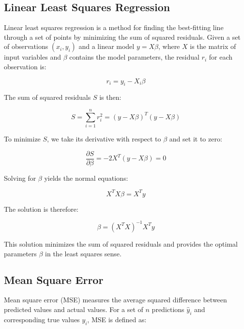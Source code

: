 \subsection{Linear Least Squares Regression}
Linear least squares regression is a method for finding the best-fitting line through a set of points by minimizing the sum of squared residuals. Given a set of observations \((x_i, y_i)\) and a linear model \(y = X\beta\), where \(X\) is the matrix of input variables and \(\beta\) contains the model parameters, the residual \(r_i\) for each observation is:

\begin{equation}
\label{eq:residual}
r_i = y_i - X_i\beta
\end{equation}

The sum of squared residuals \(S\) is then:

\begin{equation}
\label{eq:sum_squared_residuals} 
S = \sum_{i=1}^n r_i^2 = (y - X\beta)^T(y - X\beta)
\end{equation}

To minimize \(S\), we take its derivative with respect to \(\beta\) and set it to zero:

\begin{equation}
\label{eq:derivative_residuals}
\frac{\partial S}{\partial \beta} = -2X^T(y - X\beta) = 0
\end{equation}

Solving for \(\beta\) yields the normal equations:

\begin{equation}
\label{eq:normal_equations}
X^TX\beta = X^Ty
\end{equation}

The solution is therefore:

\begin{equation}
\label{eq:least_squares_solution}
\beta = (X^TX)^{-1}X^Ty
\end{equation}

This solution minimizes the sum of squared residuals and provides the optimal parameters \(\beta\) in the least squares sense.

\subsection{Mean Square Error}
Mean square error (MSE) measures the average squared difference between predicted values and actual values. For a set of \(n\) predictions \(\hat{y}_i\) and corresponding true values \(y_i\), MSE is defined as:


